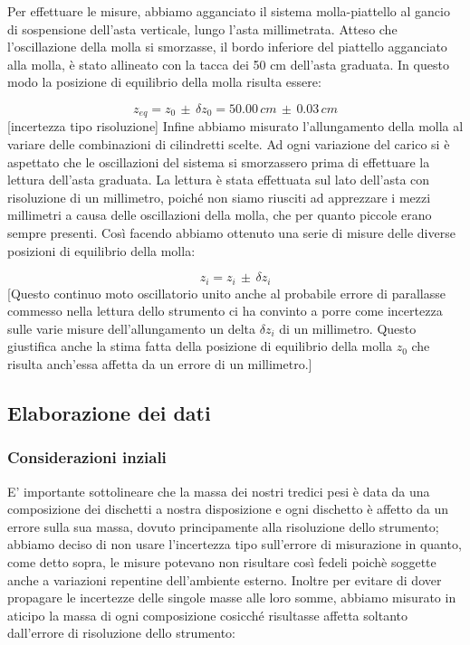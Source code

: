 Per effettuare le misure, abbiamo agganciato il sistema molla-piattello al gancio di sospensione dell'asta verticale, lungo l'asta millimetrata. Atteso che l'oscillazione della molla si smorzasse, il bordo inferiore del piattello agganciato alla molla, è stato allineato con la tacca dei 50 cm dell'asta graduata. In questo modo la posizione di equilibrio della molla risulta essere:

\begin{equation*}
	z_{eq} = z_0\,\pm\,\delta z_0 = 50.00\,cm\,\pm\,0.03\,cm
\end{equation*}
%
[incertezza tipo risoluzione]
Infine abbiamo misurato l'allungamento della molla al variare delle combinazioni di cilindretti scelte. Ad ogni variazione del carico si è aspettato che le oscillazioni del sistema si smorzassero prima di effettuare la lettura dell'asta graduata. La lettura è stata effettuata sul lato dell'asta con risoluzione di un millimetro, poiché non siamo riusciti ad apprezzare i mezzi millimetri a causa delle oscillazioni della molla, che per quanto piccole erano sempre presenti. Così facendo abbiamo ottenuto una serie di misure delle diverse posizioni di equilibrio della molla:

\begin{equation*}
	z_i = z_i\,\pm\,\delta z_i 
\end{equation*}
%
[Questo continuo moto oscillatorio unito anche al probabile errore di parallasse commesso nella lettura dello strumento ci ha convinto a porre come incertezza sulle varie misure dell'allungamento un delta $\delta z_i$ di un millimetro.
Questo giustifica anche la stima fatta della posizione di equilibrio della molla $z_0$ che risulta anch'essa affetta da un errore di un millimetro.]

\subsection{Elaborazione dei dati}

\subsubsection{Considerazioni inziali}

E' importante sottolineare che la massa dei nostri tredici pesi è data da una composizione dei dischetti a nostra disposizione e ogni dischetto è affetto da un errore sulla sua massa, dovuto principamente alla risoluzione dello strumento; abbiamo deciso di non usare l'incertezza tipo sull'errore di misurazione in quanto, come detto sopra, le misure potevano non risultare così fedeli poichè soggette anche a variazioni repentine dell'ambiente esterno.
Inoltre per evitare di dover propagare le incertezze delle singole masse alle loro somme, abbiamo misurato in aticipo la massa di ogni composizione cosicché risultasse affetta soltanto dall'errore di risoluzione dello strumento:

